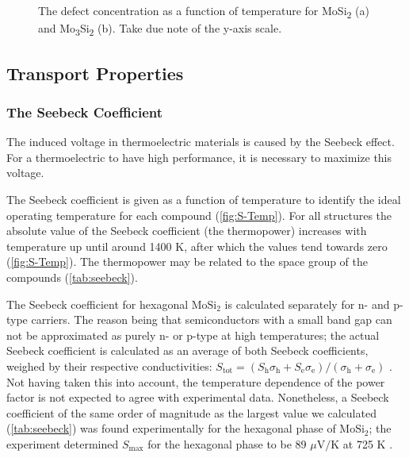 \documentclass[7.5pt]{article}
\theoremstyle{plain}
\theoremstyle{definition}
\newcommand{\<}{\langle}
\renewcommand{\>}{\rangle}
\begin{document}
\begin{figure}
\begin{subfigure}{.5\textwidth}
  \caption{}
  \label{fig:sub2}
\end{subfigure}
\caption{The defect concentration as a function of temperature for MoSi\textsubscript{2} (a)  and Mo\textsubscript{3}Si\textsubscript{2} (b). Take due note of the y-axis scale.}
\label{fig:defect-form-temp}
\end{figure}

\clearpage
\pagebreak

\subsection{Transport Properties}

\subsubsection{The Seebeck Coefficient}


\begin{multicols}{2}

\noindent The induced voltage in thermoelectric materials is caused by the Seebeck effect.
For a thermoelectric to have high performance, it is necessary to maximize this voltage. 

The Seebeck coefficient is given as a function of temperature to identify the ideal operating temperature for each compound (\autoref{fig:S-Temp}).
For all structures the absolute value of the Seebeck coefficient (the thermopower) increases with temperature up until around 1400 K, after which the values tend towards zero (\autoref{fig:S-Temp}).
The thermopower may be related to the space group of the compounds (\autoref{tab:seebeck}).

The Seebeck coefficient for hexagonal $\text{MoSi}_{2}$ is calculated separately for n- and p-type carriers. 
The reason being that semiconductors with a small band gap can not be approximated as purely n- or p-type at high temperatures; the actual Seebeck coefficient is calculated as an average of both Seebeck coefficients, weighed by their respective conductivities: 
$S_\text{tot}=\left(S_{\mathrm{h}} \sigma_{\mathrm{h}}+S_{\mathrm{e}} \sigma_{\mathrm{e}}\right)/\left(\sigma_{\mathrm{h}}+\sigma_{\mathrm{e}}\right)$ \cite{cdi_proquest_reports_1030752835}. 
Not having taken this into account, the temperature dependence of the power factor is not expected to agree with experimental data.
Nonetheless, a Seebeck coefficient of the same order of magnitude as the largest value we calculated (\autoref{tab:seebeck}) was found experimentally for the hexagonal phase of $\text{MoSi}_{2}$; the experiment determined $S_\text{max}$ for the hexagonal phase to be 89 $\mu\text{V/K}$ at 725 K \cite{YAMADA2011908}.

\end{multicols}
\end{document}

